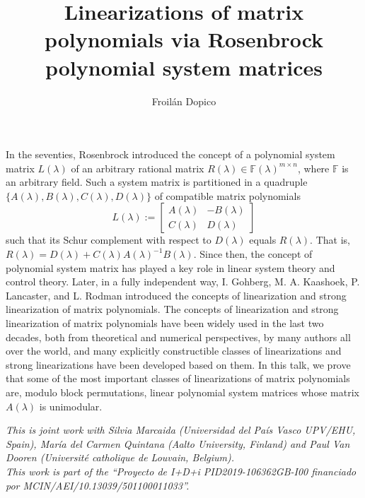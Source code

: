 \documentclass[a4paper]{amsart}
\date{}
\begin{document}
\title{Linearizations of matrix polynomials via Rosenbrock polynomial system matrices}
\author{Froil\'an Dopico} %
\address{Universidad Carlos III de Madrid, Spain} %

\maketitle


In the seventies, Rosenbrock \cite{Ros70} introduced the concept of a polynomial system matrix $L(\lambda)$ of an arbitrary rational matrix $R(\lambda)\in\mathbb{F}(\lambda)^{m\times n}$, where $\mathbb{F}$ is an arbitrary field.
Such a system matrix is partitioned in a quadruple $\{A(\lambda),B(\lambda),\allowbreak C(\lambda),D(\lambda)\}$ of compatible matrix polynomials 
\[ L(\lambda):=\left[\begin{array}{cr} A(\lambda) & -B(\lambda) \\ C(\lambda) & D(\lambda)
\end{array}\right]
\]
such that its Schur complement with respect to $D(\lambda)$ equals $R(\lambda)$. That is, $R(\lambda)= D(\lambda) + C(\lambda)A(\lambda)^{-1}B(\lambda)$. Since then, the concept of polynomial system matrix has played a key role in linear system theory and control theory. Later, in a fully independent way, I. Gohberg, M. A. Kaashoek, P. Lancaster, and L. Rodman introduced the concepts of linearization \cite{GohbergLancasterRodman09} and strong linearization \cite{gkl} of matrix polynomials. The concepts of linearization and strong linearization of matrix polynomials have been widely used in the last two decades, both from theoretical and numerical perspectives, by many authors all over the world, and many explicitly constructible classes of linearizations and strong linearizations have been developed based on them. In this talk, we prove that some of the most important classes of linearizations of matrix polynomials are, modulo block permutations, linear polynomial system matrices whose matrix $A(\lambda)$ is unimodular.

\emph{This is joint work with Silvia Marcaida (Universidad del Pa\'is Vasco
UPV/EHU, Spain), Mar\'ia del Carmen Quintana (Aalto University, Finland) and Paul Van Dooren (Université catholique de Louvain, Belgium). \\
This work is part of the ``Proyecto de I+D+i PID2019-106362GB-I00 financiado
por  MCIN/AEI/10.13039/501100011033''.}
\end{document}
